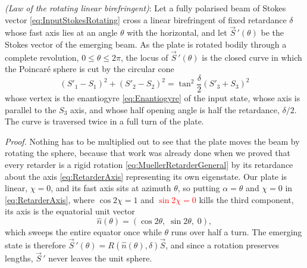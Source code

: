             \begin{myteo}
                \textit{(Law of the rotating linear birefringent)}: Let a fully polarised beam of Stokes vector \ref{eq:InputStokesRotating} cross a linear birefringent of fixed retardance $\delta$ whose fast axis lies at an angle $\theta$ with the horizontal, and let $\vec{S}\,'(\theta)$ be the Stokes vector of the emerging beam. As the plate is rotated bodily through a complete revolution, $0\leq\theta\leq2\pi$, the locus of $\vec{S}\,'(\theta)$ is the closed curve in which the Poincaré sphere is cut by the circular cone
                \begin{equation}\label{eq:RotatingRetarderCone}
                    \boxed{\;\left(S'_1-S_1\right)^2+\left(S'_2-S_2\right)^2 = \tan^2\frac{\delta}{2}\left(S'_3+S_3\right)^2\;}
                \end{equation}
                whose vertex is the enantiogyre \ref{eq:Enantiogyre} of the input state, whose axis is parallel to the $S_3$ axis, and whose half opening angle is half the retardance, $\delta/2$. The curve is traversed twice in a full turn of the plate.
            \end{myteo}

            \textit{Proof.} Nothing has to be multiplied out to see that the plate moves the beam by rotating the sphere, because that work was already done when we proved that every retarder is a rigid rotation \ref{eq:MuellerRetarderGeneral} by its retardance about the axis \ref{eq:RetarderAxis} representing its own eigenstate. Our plate is linear, $\chi=0$, and its fast axis sits at azimuth $\theta$, so putting $\alpha=\theta$ and $\chi=0$ in \ref{eq:RetarderAxis}, where $\cos2\chi=1$ and \textcolor{red}{$\sin2\chi=0$} kills the third component, its axis is the equatorial unit vector
            \begin{equation}\label{eq:PlateAxis}
                \hat{n}(\theta) = \left(\cos2\theta,\;\sin2\theta,\;0\right),
            \end{equation}
            which sweeps the entire equator once while $\theta$ runs over half a turn. The emerging state is therefore $\vec{S}\,'(\theta)=R\left(\hat{n}(\theta),\delta\right)\vec{S}$, and since a rotation preserves lengths, $\vec{S}\,'$ never leaves the unit sphere.

